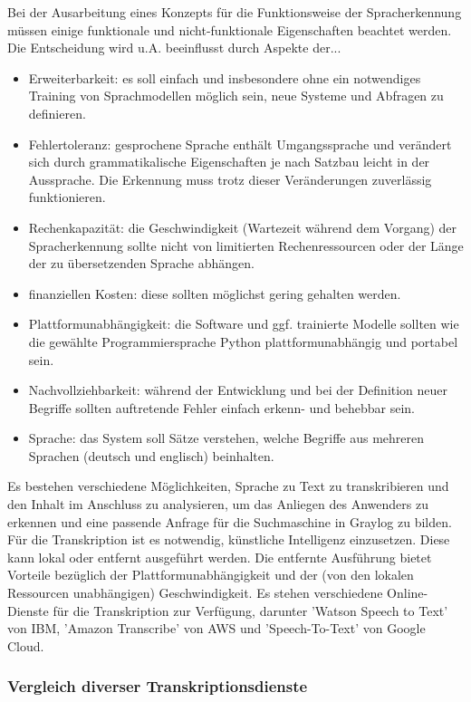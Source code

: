 Bei der Ausarbeitung eines Konzepts für die Funktionsweise der Spracherkennung müssen einige funktionale und nicht-funktionale Eigenschaften beachtet werden. Die Entscheidung wird u.A. beeinflusst durch Aspekte der... 

\begin{itemize}
\item Erweiterbarkeit: es soll einfach und insbesondere ohne ein notwendiges Training von Sprachmodellen möglich sein, neue Systeme und Abfragen zu definieren.
\item Fehlertoleranz: gesprochene Sprache enthält Umgangssprache und verändert sich durch grammatikalische Eigenschaften je nach Satzbau leicht in der Aussprache. Die Erkennung muss trotz dieser Veränderungen zuverlässig funktionieren.
\item Rechenkapazität: die Geschwindigkeit (Wartezeit während dem Vorgang) der Spracherkennung sollte nicht von limitierten Rechenressourcen oder der Länge der zu übersetzenden Sprache abhängen.
\item finanziellen Kosten: diese sollten möglichst gering gehalten werden.
\item Plattformunabhängigkeit: die Software und ggf. trainierte Modelle sollten wie die gewählte Programmiersprache Python plattformunabhängig und portabel sein.
\item Nachvollziehbarkeit: während der Entwicklung und bei der Definition neuer Begriffe sollten auftretende Fehler einfach erkenn- und behebbar sein.
\item Sprache: das System soll Sätze verstehen, welche Begriffe aus mehreren Sprachen (deutsch und englisch) beinhalten.
\end{itemize}

Es bestehen verschiedene Möglichkeiten, Sprache zu Text zu transkribieren und den Inhalt im Anschluss zu analysieren, um das Anliegen des Anwenders zu erkennen und eine passende Anfrage für die Suchmaschine in Graylog zu bilden. Für die Transkription ist es notwendig, künstliche Intelligenz einzusetzen. Diese kann lokal oder entfernt ausgeführt werden. Die entfernte Ausführung bietet Vorteile bezüglich der Plattformunabhängigkeit und der (von den lokalen Ressourcen unabhängigen) Geschwindigkeit. Es stehen verschiedene Online-Dienste für die Transkription zur Verfügung, darunter 'Watson Speech to Text' von IBM, 'Amazon Transcribe' von AWS und 'Speech-To-Text' von Google Cloud. 

\newpage

\subsubsection{Vergleich diverser Transkriptionsdienste}

